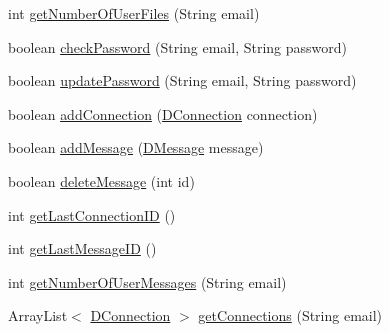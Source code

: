 \begin{DoxyCompactItemize}
\item 
int \mbox{\hyperlink{interfacees_1_1deusto_1_1bspq18_1_1e6_1_1_deusto_box_1_1_server_1_1jdo_1_1dao_1_1_i_deusto_box_d_a_o_a285d230801e0a518610f1dd389d9f3f0}{get\+Number\+Of\+User\+Files}} (String email)
\item 
boolean \mbox{\hyperlink{interfacees_1_1deusto_1_1bspq18_1_1e6_1_1_deusto_box_1_1_server_1_1jdo_1_1dao_1_1_i_deusto_box_d_a_o_a4d9024d3a5d8cf9087be17d33f34363f}{check\+Password}} (String email, String password)
\item 
boolean \mbox{\hyperlink{interfacees_1_1deusto_1_1bspq18_1_1e6_1_1_deusto_box_1_1_server_1_1jdo_1_1dao_1_1_i_deusto_box_d_a_o_a578dbf0e8ac83f96643e06621afaa6ce}{update\+Password}} (String email, String password)
\item 
boolean \mbox{\hyperlink{interfacees_1_1deusto_1_1bspq18_1_1e6_1_1_deusto_box_1_1_server_1_1jdo_1_1dao_1_1_i_deusto_box_d_a_o_aee8406e88334179d4692d118e6ba221d}{add\+Connection}} (\mbox{\hyperlink{classes_1_1deusto_1_1bspq18_1_1e6_1_1_deusto_box_1_1_server_1_1jdo_1_1data_1_1_d_connection}{D\+Connection}} connection)
\item 
boolean \mbox{\hyperlink{interfacees_1_1deusto_1_1bspq18_1_1e6_1_1_deusto_box_1_1_server_1_1jdo_1_1dao_1_1_i_deusto_box_d_a_o_a12a32d9b33be794d0e06cd883b3ecf7d}{add\+Message}} (\mbox{\hyperlink{classes_1_1deusto_1_1bspq18_1_1e6_1_1_deusto_box_1_1_server_1_1jdo_1_1data_1_1_d_message}{D\+Message}} message)
\item 
boolean \mbox{\hyperlink{interfacees_1_1deusto_1_1bspq18_1_1e6_1_1_deusto_box_1_1_server_1_1jdo_1_1dao_1_1_i_deusto_box_d_a_o_ad7d7a9d742eeb1a52f7de1e37481311b}{delete\+Message}} (int id)
\item 
int \mbox{\hyperlink{interfacees_1_1deusto_1_1bspq18_1_1e6_1_1_deusto_box_1_1_server_1_1jdo_1_1dao_1_1_i_deusto_box_d_a_o_a2c58e0d1d93997b87ebf202054a46d84}{get\+Last\+Connection\+ID}} ()
\item 
int \mbox{\hyperlink{interfacees_1_1deusto_1_1bspq18_1_1e6_1_1_deusto_box_1_1_server_1_1jdo_1_1dao_1_1_i_deusto_box_d_a_o_a266cc12f9fe62e9b8083ef47a84be129}{get\+Last\+Message\+ID}} ()
\item 
int \mbox{\hyperlink{interfacees_1_1deusto_1_1bspq18_1_1e6_1_1_deusto_box_1_1_server_1_1jdo_1_1dao_1_1_i_deusto_box_d_a_o_a6aa714befe2b374ddf1c153430e8c7d3}{get\+Number\+Of\+User\+Messages}} (String email)
\item 
Array\+List$<$ \mbox{\hyperlink{classes_1_1deusto_1_1bspq18_1_1e6_1_1_deusto_box_1_1_server_1_1jdo_1_1data_1_1_d_connection}{D\+Connection}} $>$ \mbox{\hyperlink{interfacees_1_1deusto_1_1bspq18_1_1e6_1_1_deusto_box_1_1_server_1_1jdo_1_1dao_1_1_i_deusto_box_d_a_o_a22a4b6e993fbd8a6f5cd2b5e5c5aa211}{get\+Connections}} (String email)

\end{DoxyCompactItemize}
